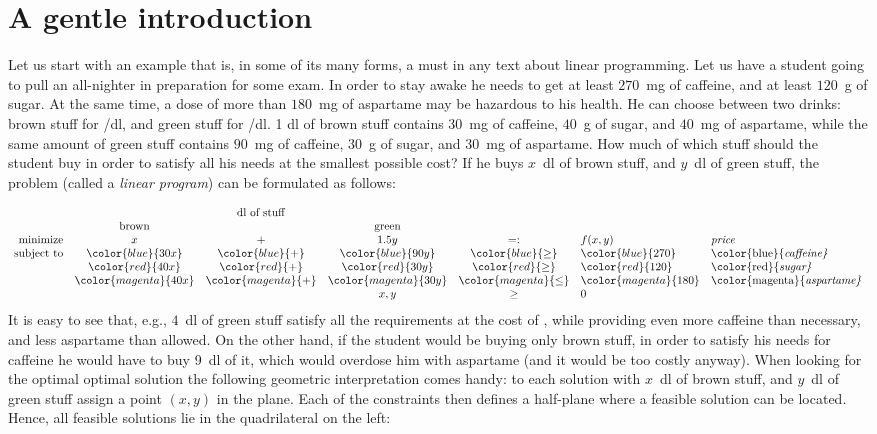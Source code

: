 \section{A gentle introduction}

Let us start with an example that is, in some of its many forms, a must
in any text about linear programming. Let us have a student  
going to pull an all-nighter in preparation for some exam. In order to 
stay awake he needs to get at least 
$270$~mg of caffeine, and at least $120$~g of sugar. At the same time,
a dose of more than $180$~mg of aspartame may be hazardous to his health. 
He can choose between two drinks: brown stuff for \hbox{/dl}, and
green stuff for \hbox{/dl.}
1 dl of brown stuff contains  $30$~mg of caffeine, $40$~g of sugar, and
$40$~mg of aspartame, while the same amount of green stuff contains
$90$~mg of caffeine, $30$~g of sugar, and $30$~mg of aspartame. 
How much of which stuff should the student buy in order to satisfy all his needs
at the smallest possible cost?
If he buys $x$~dl of brown stuff, and $y$~dl of green stuff, the problem
(called a {\em linear program}) can be formulated as follows:


\begin{equation}
  \label{eq:LP:1}
\begin{array}{rccccll}
                          & \multicolumn{3}{c}{\text{dl of stuff}} \\ 
                          & \text{brown} & & \text{green}\\
  {\rm minimize}     & x   & + & 1.5 y & =: & f(x,y) &  \text{\em price}\\
  {\rm subject\ to} & \color{blue}{30 x } & \color{blue}{+} & \color{blue}{90 y} & \color{blue}{\ge} & \color{blue}{270} & \text{\color{blue}{\em caffeine}}\\ 
                           & \color{red}{40 x}   & \color{red}{+}  & \color{red}{30 y}  & \color{red}{\ge} & \color{red}{120} & \text{\color{red}{\em sugar}} \\
                           & \color{magenta}{40 x} & \color{magenta}{+} & \color{magenta}{30 y} & \color{magenta}{\le} & \color{magenta}{180} & \text{\color{magenta}{\em aspartame}}\\
                          &      &   & x,y  &\ge& 0
\end{array}
\end{equation}
%
It is easy to see that, e.g., $4$~dl of green stuff satisfy all the requirements
at the cost of , while providing even more caffeine than necessary, and
less aspartame than allowed. On the other hand, if the student would be buying
only brown stuff, in order to satisfy his needs for caffeine he would have
to buy 9~dl of it, which would overdose him with aspartame (and it would be
too costly anyway).
When looking for the optimal optimal solution the following geometric interpretation
comes handy: to each solution with $x$~dl of brown stuff, and $y$~dl of green stuff
assign a point $(x,y)$ in the plane. Each of the constraints then defines a half-plane
where a feasible solution can be located. Hence, all feasible solutions lie in the
quadrilateral on the left:


